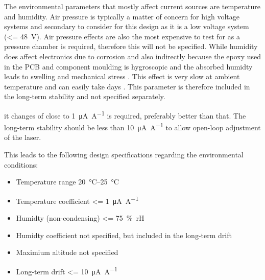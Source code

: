 The environmental parameters that mostly affect current sources are temperature and humidity. Air pressure is typically a matter of concern for high voltage systems \cite{IPC-2221B} and secondary to consider for this design as it is a low voltage system (\qty{<= 48}{\V}). Air pressure effects are also the most expensive to test for as a pressure chamber is required, therefore this will not be specified. While humidity does affect electronics due to corrosion and also indirectly because the epoxy used in the PCB and component moulding is hygroscopic and the absorbed humidty leads to swelling and mechanical stress \cite{epoxy_humidity}. This effect is very slow at ambient temperature and can easily take days \cite{epoxy_humidity}. This parameter is therefore included in the long-term stability and not specified separately.

it changes  of close to \qty[per-mode = symbol]{1}{\uA \per \A} is required, preferably better than that. The long-term stability should be less than \qty[per-mode = symbol]{10}{\uA \per \A} to allow open-loop adjustment of the laser.

This leads to the following design specifications regarding the environmental conditions:

\begin{center}
    \begin{tcolorbox}[
        colback=red!5!white,
        colframe=red!75!black,
        title=Current controller environmental design specifications,
        width=0.8\linewidth,
        ]
    \begin{itemize}
        \item Temperature range \qtyrange{20}{25}{\celsius}
        \item Temperature coefficient \qty[per-mode = symbol]{<= 1}{\uA \per A}
        \item Humidty (non-condensing) \qty{<= 75}{\percent rH}
        \item Humidty coefficient not specified, but included in the long-term drift
        \item Maximium altitude not specified
        \item Long-term drift \qty[per-mode = symbol]{<= 10}{\uA \per \A}
    \end{itemize}
    \end{tcolorbox}
\end{center}


